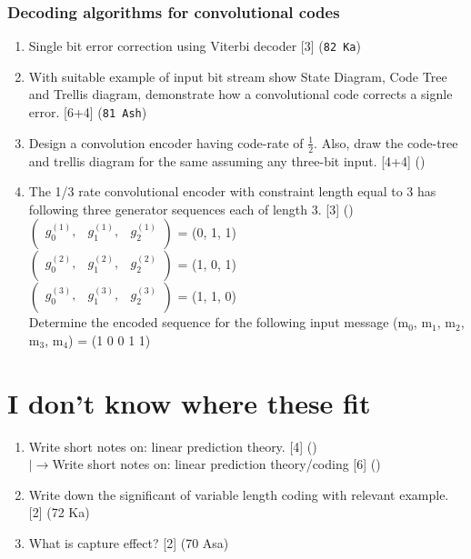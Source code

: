 \documentclass[12pt]{article}
\newcommand{\lb}{\\$\left|\rightarrow\right.$}
\begin{document}
    \subsubsection{Decoding algorithms for convolutional codes}
      \begin{enumerate}
        \item Single bit error correction using Viterbi decoder \hfill [3] (\texttt{82 Ka})

        \item With suitable example of input bit stream show State Diagram, Code Tree and Trellis diagram, demonstrate how a convolutional code corrects a signle error. \hfill [6+4] (\texttt{81 Ash})

        \item Design a convolution encoder having code-rate of $\frac{1}{2}$. Also, draw the code-tree and trellis diagram for the same assuming any three-bit input. \hfill [4+4] ()
        
        \item The 1/3 rate convolutional encoder with constraint length equal to 3 has following three generator sequences each of length 3. \hfill [3] ()\\
        $\begin{pmatrix}
        	g _0^{(1)}, & g_1^{(1)}, & g_2^{(1)} \\
        \end{pmatrix}$
        = (0, 1, 1)\\
        $\begin{pmatrix}
        	g _0^{(2)}, & g_1^{(2)}, & g_2^{(2)} \\
        \end{pmatrix}$
        = (1, 0, 1)\\
        $\begin{pmatrix}
        	g _0^{(3)}, & g_1^{(3)}, & g_2^{(3)} \\
        \end{pmatrix}$
        = (1, 1, 0)\\
        Determine the encoded sequence for the following input message  (m$_0$, m$_1$, m$_2$, m$_3$, m$_4$) = (1 0 0 1 1)
      \end{enumerate}
      
\section{I don't know where these fit}
	\begin{enumerate}
		\item Write short notes on: linear prediction theory. \hfill [4] ()
		\lb Write short notes on: linear prediction theory/coding \hfill [6] ()
		
		\item Write down the significant of variable length coding with relevant example. \hfill [2] (72 Ka)
		
		\item What is capture effect? \hfill [2] (70 Asa)
	\end{enumerate}
\end{document}
